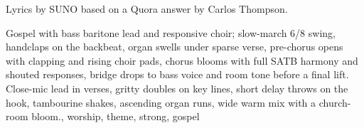 

\begin{notes}
Lyrics by SUNO based on a Quora answer by Carlos Thompson.
\end{notes}

\begin{style}
Gospel with bass baritone lead and responsive choir; slow-march 6/8 swing, handclaps on the backbeat, organ swells under sparse verse, pre-chorus opens with clapping and rising choir pads, chorus blooms with full SATB harmony and shouted responses, bridge drops to bass voice and room tone before a final lift. %
Close-mic lead in verses, gritty doubles on key lines, short delay throws on the hook, tambourine shakes, ascending organ runs, wide warm mix with a church-room bloom., worship, theme, strong, gospel
\end{style}

